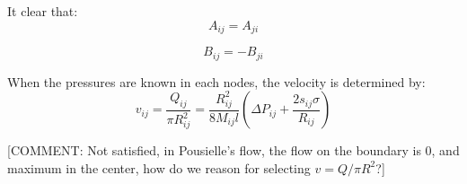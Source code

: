 	It clear that:
	\begin{equation} \label{eq:symmetry-of-a}
		A_{ij} = A_{ji}
	\end{equation}
	
	\begin{equation} \label{eq:symmetry-of-b}
		B_{ij} = -B_{ji}
	\end{equation}
	
	When the pressures are known in each nodes, the velocity is determined by:
	\begin{equation} \label{eq:velocity-from-pressures}
		v_{ij} = \frac{Q_{ij}}{\pi R_{ij}^2} = \frac{R_{ij}^2}{8M_{ij}l} \left( \Delta P_{ij} + \frac{2s_{ij} \sigma}{R_{ij}} \right)
	\end{equation}
	
	[COMMENT: Not satisfied, in Pousielle's flow, the flow on the boundary is 0, and maximum in the center, how do we reason for selecting $v = Q/ \pi R^2$?]
